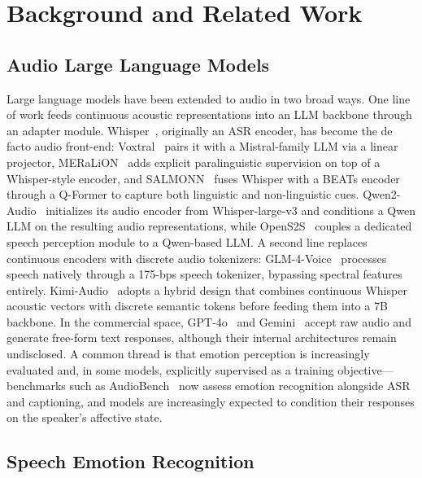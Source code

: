 
\section{Background and Related Work}
\label{sec:background}

\subsection{Audio Large Language Models}
\label{sec:bg_allm}

Large language models have been extended to audio in two broad ways.
One line of work feeds continuous acoustic representations into an LLM backbone through an adapter module.
Whisper~\cite{whisper}, originally an ASR encoder, has become the de facto audio front-end: Voxtral~\cite{voxtral} pairs it with a Mistral-family LLM via a linear projector, MERaLiON~\cite{meralion} adds explicit paralinguistic supervision on top of a Whisper-style encoder, and SALMONN~\cite{salmonn} fuses Whisper with a BEATs encoder through a Q-Former to capture both linguistic and non-linguistic cues.
Qwen2-Audio~\cite{qwen2audio} initializes its audio encoder from Whisper-large-v3 and conditions a Qwen LLM on the resulting audio representations, while OpenS2S~\cite{opens2s} couples a dedicated speech perception module to a Qwen-based LLM.
A second line replaces continuous encoders with discrete audio tokenizers: GLM-4-Voice~\cite{glm4voice} processes speech natively through a 175-bps speech tokenizer, bypassing spectral features entirely.
Kimi-Audio~\cite{kimiaudio} adopts a hybrid design that combines continuous Whisper acoustic vectors with discrete semantic tokens before feeding them into a 7B backbone.
In the commercial space, GPT-4o~\cite{gpt4o} and Gemini~\cite{gemini} accept raw audio and generate free-form text responses, although their internal architectures remain undisclosed.
A common thread is that emotion perception is increasingly evaluated and, in some models, explicitly supervised as a training objective---benchmarks such as AudioBench~\cite{audiobench} now assess emotion recognition alongside ASR and captioning, and models are increasingly expected to condition their responses on the speaker's affective state.

\subsection{Speech Emotion Recognition}
\label{sec:bg_emotion}

